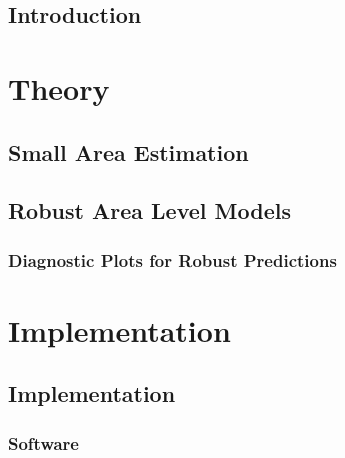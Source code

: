 % 

\chapter{Introduction}



\part{Theory}\label{part:theory}

\chapter{Small Area Estimation}









\chapter{Robust Area Level Models}\label{chap:rfh}





\section{Diagnostic Plots for Robust Predictions}


\part{Implementation}\label{part:implementation}

\chapter{Implementation}\label{part:implementation}

\section{Software}
